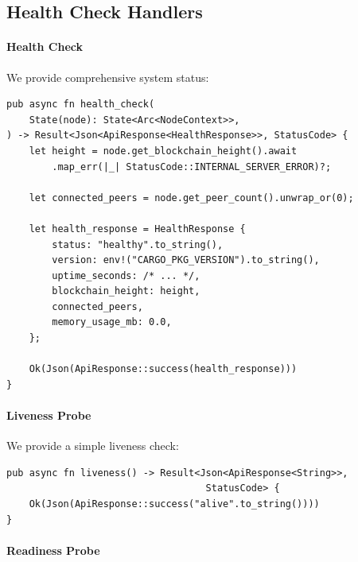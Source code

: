\subsection{Health Check Handlers}

\paragraph{Health Check}

We provide comprehensive system status:

\begin{listing}[htbp]
\caption{Health check handler with full metrics}
\label{lst:handler-health}
\begin{verbatim}
pub async fn health_check(
    State(node): State<Arc<NodeContext>>,
) -> Result<Json<ApiResponse<HealthResponse>>, StatusCode> {
    let height = node.get_blockchain_height().await
        .map_err(|_| StatusCode::INTERNAL_SERVER_ERROR)?;

    let connected_peers = node.get_peer_count().unwrap_or(0);

    let health_response = HealthResponse {
        status: "healthy".to_string(),
        version: env!("CARGO_PKG_VERSION").to_string(),
        uptime_seconds: /* ... */,
        blockchain_height: height,
        connected_peers,
        memory_usage_mb: 0.0,
    };

    Ok(Json(ApiResponse::success(health_response)))
}
\end{verbatim}
\end{listing}

\paragraph{Liveness Probe}

We provide a simple liveness check:

\begin{listing}[htbp]
\caption{Liveness probe handler}
\label{lst:handler-liveness}
\begin{verbatim}
pub async fn liveness() -> Result<Json<ApiResponse<String>>,
                                   StatusCode> {
    Ok(Json(ApiResponse::success("alive".to_string())))
}
\end{verbatim}
\end{listing}

\paragraph{Readiness Probe}

